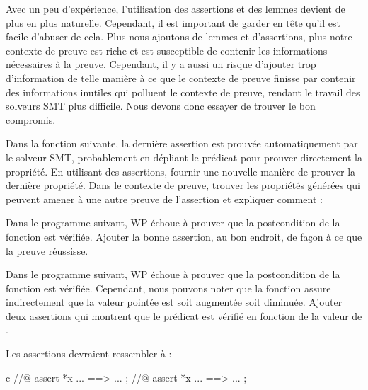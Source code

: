 Avec un peu d'expérience, l'utilisation des assertions et des lemmes devient de
plus en plus naturelle. Cependant, il est important de garder en tête qu'il est
facile d'abuser de cela. Plus nous ajoutons de lemmes et d'assertions, plus notre
contexte de preuve est riche et est susceptible de contenir les informations
nécessaires à la preuve. Cependant, il y a aussi un risque d'ajouter trop
d'information de telle manière à ce que le contexte de preuve finisse par contenir
des informations inutiles qui polluent le contexte de preuve, rendant le travail
des solveurs SMT plus difficile. Nous devons donc essayer de trouver le bon
compromis.






Dans la fonction suivante, la dernière assertion est prouvée automatiquement
par le solveur SMT, probablement en dépliant le prédicat pour prouver
directement la propriété. En utilisant des assertions, fournir une nouvelle
manière de prouver la dernière propriété. Dans le contexte de preuve, trouver
les propriétés générées qui peuvent amener à une autre preuve de l'assertion
et expliquer comment :






Dans le programme suivant, WP échoue à prouver que la postcondition de la
fonction  est vérifiée. Ajouter la bonne assertion, au bon endroit,
de façon à ce que la preuve réussisse.






Dans le programme suivant, WP échoue à prouver que la postcondition de la
fonction  est vérifiée. Cependant, nous pouvons noter
que la fonction  assure indirectement que la valeur pointée
est soit augmentée soit diminuée. Ajouter deux assertions qui montrent que
le prédicat est vérifié en fonction de la valeur de .




Les assertions devraient ressembler à :


\begin{CodeBlock}{c}
//@ assert *x ... ==> ... ;
//@ assert *x ... ==> ... ;
\end{CodeBlock}


